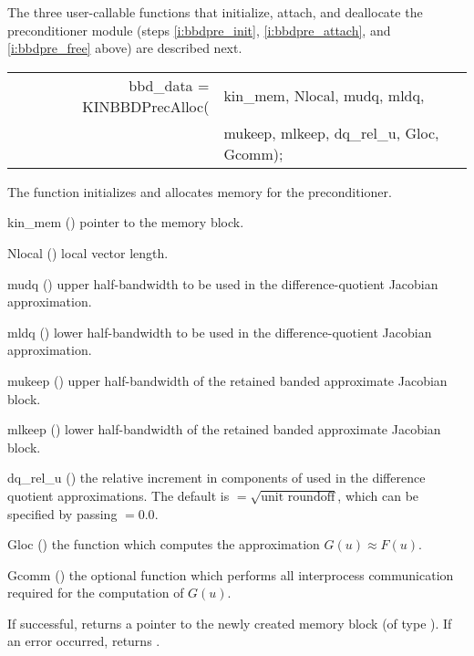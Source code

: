 The three user-callable functions that initialize, attach, and deallocate
the {\kinbbdpre} preconditioner module (steps \ref{i:bbdpre_init},
\ref{i:bbdpre_attach}, and \ref{i:bbdpre_free} above) are described
next.
{
   \begin{tabular}[t]{@{}r@{}l@{}}
     bbd\_data = KINBBDPrecAlloc(&kin\_mem, Nlocal, mudq, mldq, \\
                                 &mukeep, mlkeep, dq\_rel\_u, Gloc, Gcomm);
   \end{tabular}
}
{
  The function  initializes and allocates
  memory for the {\kinbbdpre} preconditioner.
}
{
  \begin{args}[dq\_rel\_u]
  \item[kin\_mem] ()
    pointer to the {\kinsol} memory block.
  \item[Nlocal] ()
    local vector length.
  \item[mudq] ()
    upper half-bandwidth to be used in the difference-quotient Jacobian approximation.
  \item[mldq] ()
    lower half-bandwidth to be used in the difference-quotient Jacobian approximation.
  \item[mukeep] ()
    upper half-bandwidth of the retained banded approximate Jacobian block.
  \item[mlkeep] ()
    lower half-bandwidth of the retained banded approximate Jacobian block.
  \item[dq\_rel\_u] ()
    the relative increment in components of  used in the difference quotient
    approximations.  The default is $ = \sqrt{\text{unit roundoff}}$,
    which can be specified by passing $ = 0.0$.
  \item[Gloc] ()
    the {\C} function which computes the approximation $G(u) \approx F(u)$. 
  \item[Gcomm] ()
    the optional {\C} function which performs all interprocess communication required for
    the computation of $G(u)$.
  \end{args}
}
{
  If successful,  returns a pointer to the newly created 
  {\kinbbdpre} memory block (of type ).
  If an error occurred,  returns .
}
